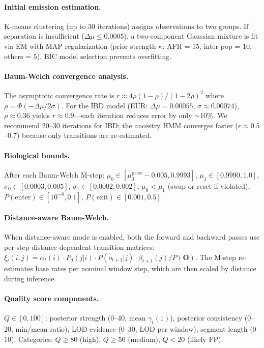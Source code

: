 \documentclass[11pt]{article}
\begin{document}
\paragraph{Initial emission estimation.}
K-means clustering (up to 30 iterations) assigns observations to two groups. If separation is insufficient ($\Delta\mu \leq 0.0005$), a two-component Gaussian mixture is fit via EM with MAP regularization (prior strength $\kappa$: AFR = 15, inter-pop = 10, others = 5). BIC model selection prevents overfitting.

\paragraph{Baum-Welch convergence analysis.}
The asymptotic convergence rate is $r \approx 4\rho(1-\rho)/(1-2\rho)^2$ where $\rho = \Phi(-\Delta\mu/2\sigma)$. For the IBD model (EUR: $\Delta\mu = 0.00055$, $\sigma \approx 0.00074$), $\rho \approx 0.36$ yields $r \approx 0.9$---each iteration reduces error by only $\sim$10\%. We recommend 20--30 iterations for IBD; the ancestry HMM converges faster ($r \approx 0.5$--$0.7$) because only transitions are re-estimated.

\paragraph{Biological bounds.}
After each Baum-Welch M-step: $\mu_0 \in [\mu_0^{\text{prior}} - 0.005, 0.9993]$, $\mu_1 \in [0.9990, 1.0]$, $\sigma_0 \in [0.0003, 0.005]$, $\sigma_1 \in [0.0002, 0.002]$, $\mu_0 < \mu_1$ (swap or reset if violated), $P(\text{enter}) \in [10^{-8}, 0.1]$, $P(\text{exit}) \in [0.001, 0.5]$.

\paragraph{Distance-aware Baum-Welch.}
When distance-aware mode is enabled, both the forward and backward passes use per-step distance-dependent transition matrices: $\xi_t(i,j) = \alpha_t(i) \cdot P_d(j|i) \cdot P(o_{t+1}|j) \cdot \beta_{t+1}(j) / P(\mathbf{O})$. The M-step re-estimates base rates per nominal window step, which are then scaled by distance during inference.

\paragraph{Quality score components.}
$Q \in [0, 100]$: posterior strength (0--40, mean $\gamma_t(1)$), posterior consistency (0--20, min/mean ratio), LOD evidence (0--30, LOD per window), segment length (0--10). Categories: $Q \geq 80$ (high), $Q \geq 50$ (medium), $Q < 20$ (likely FP).
\end{document}
